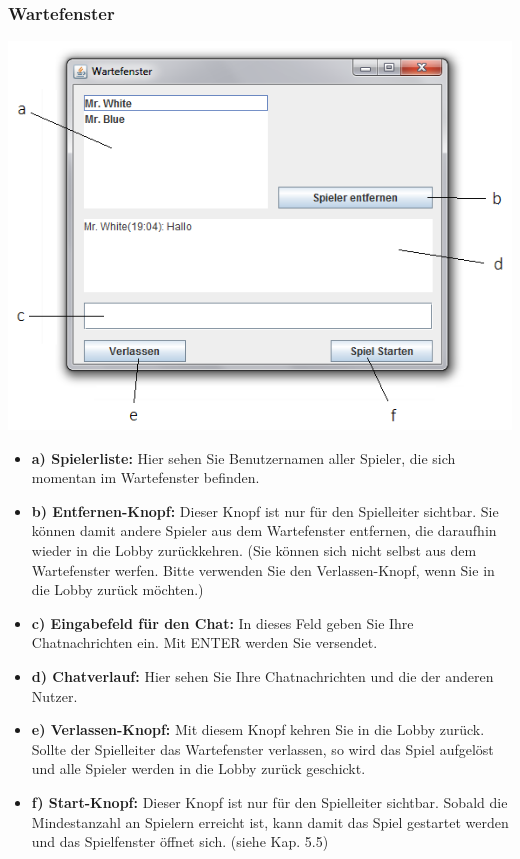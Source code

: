 \documentclass[titlepage,10pt,a4paper]{article}
\begin{document}
\subsubsection{Wartefenster}
\includegraphics[width=\textwidth]{Warte-Fenster}
\begin{itemize}
	\item \textbf{a) Spielerliste:} Hier sehen Sie Benutzernamen aller Spieler, die sich momentan im \gls{Wartefenster} befinden.
	\item \textbf{b) Entfernen-Knopf:} Dieser Knopf ist nur für den Spielleiter sichtbar. Sie können damit andere Spieler aus dem \gls{Wartefenster} entfernen, die daraufhin wieder in die \gls{Lobby} zurückkehren. (Sie können sich nicht selbst aus dem \gls{Wartefenster} werfen. Bitte verwenden Sie den Verlassen-Knopf, wenn Sie in die \gls{Lobby} zurück möchten.)
	\item \textbf{c) Eingabefeld für den Chat:} In dieses Feld geben Sie Ihre Chatnachrichten ein. Mit ENTER werden Sie versendet.
	\item \textbf{d) Chatverlauf:} Hier sehen Sie Ihre Chatnachrichten und die der anderen Nutzer.
	\item \textbf{e) Verlassen-Knopf:} Mit diesem Knopf kehren Sie in die \gls{Lobby} zurück. Sollte der \gls{Spielleiter} das \gls{Wartefenster} verlassen, so wird das Spiel aufgelöst und alle Spieler werden in die Lobby zurück geschickt.
	\item \textbf{f) Start-Knopf:} Dieser Knopf ist nur für den \gls{Spielleiter} sichtbar. Sobald die Mindestanzahl an Spielern erreicht ist, kann damit das Spiel gestartet werden und das Spielfenster öffnet sich. (siehe Kap. 5.5)
\end{itemize}
\end{document}
